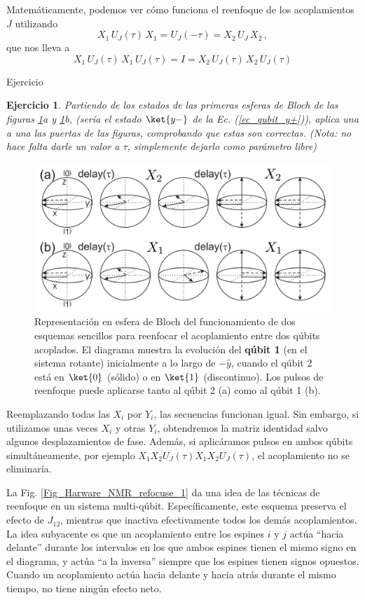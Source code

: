 \documentclass[a4paper,11pt]{book} %
\newtheorem{ejercicio_contador}{Ejercicio}
\newcommand{\Ejercicio}[1]{
		\begin{mybox_gray}{Ejercicio} 
			\begin{ejercicio_contador}
				 #1 
			\end{ejercicio_contador} 
		\end{mybox_gray}
	}
\numberwithin{equation}{chapter}
\begin{document}
Matemáticamente, podemos ver cómo funciona el reenfoque de los acoplamientos $J$ utilizando 
	\begin{equation}
	X_1 \, U_J(\tau) \, X_1 = U_J (- \tau) = X_2 \, U_J \, X_2 \, ,
	\end{equation}
que nos lleva a 
	\begin{equation}
	 X_1 \, U_J(\tau) \, X_1 \, U_J(\tau) = I =  X_2 \, U_J(\tau) \, X_2 \, U_J(\tau)
	\end{equation}

	\Ejercicio{
	Partiendo de los estados de las primeras esferas de Bloch de las figuras  \ref{Fig_Harware_NMR_refocusing}a y \ref{Fig_Harware_NMR_refocusing}b, (sería el estado $\ket{y-}$ de la Ec.    (\ref{ec_qubit_y+})), aplica una a una las puertas de las figuras, comprobando que estas son correctas. (Nota: no hace falta darle un valor a $\tau$, simplemente dejarlo como parámetro libre)
	}



	\begin{figure}[t]
	\centering 
	\includegraphics[width=0.7\linewidth]{Figuras/Fig_Harware_NMR_refocusing.png}
	\caption{Representación en esfera de Bloch del funcionamiento de dos esquemas sencillos para reenfocar el acoplamiento entre dos qúbits acoplados. El diagrama muestra la evolución del \textbf{qúbit 1} (en el sistema rotante) inicialmente a lo largo de $- \hat{y}$, cuando el qúbit 2 está en $\ket{0}$ (sólido) o en $\ket{1}$ (discontinuo). Los pulsos de reenfoque puede aplicarse tanto al  qúbit 2 (a) como al qúbit 1 (b).}
	\label{Fig_Harware_NMR_refocusing}
	\end{figure}


Reemplazando todas las $X_i$ por $Y_i$, las secuencias funcionan igual. Sin embargo, si utilizamos unas veces $X_i$ y otras $Y_i$, obtendremos la matriz identidad salvo algunos desplazamientos de fase. Además, si aplicáramos pulsos en ambos qúbits simultáneamente, por ejemplo $X_1X_2 U_J(\tau)X_1 X_2 U_J(\tau)$, el acoplamiento no se eliminaría. 

La Fig. \ref{Fig_Harware_NMR_refocuse_1} da una idea de las técnicas de reenfoque en un sistema multi-qúbit. Específicamente, este esquema preserva el efecto de $J_{12}$, mientras que inactiva efectivamente todos los demás acoplamientos. La idea subyacente es que un acoplamiento entre los espines $i$ y $j$ actúa ``hacia delante'' durante los intervalos en los que ambos espines tienen el mismo signo en el diagrama, y actúa ``a la inversa'' siempre que los espines tienen signos opuestos. Cuando un acoplamiento actúa hacia delante y hacia atrás durante el mismo tiempo, no tiene ningún efecto neto.
\end{document}
